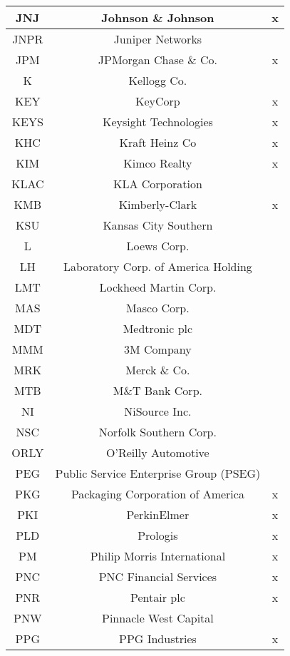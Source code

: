 \documentclass[11pt]{article}
\begin{document}
\begin{onehalfspace}
\begin{longtable}[h!]{|c|c|c|}
        JNJ & Johnson \& Johnson & x \\ \hline
        JNPR & Juniper Networks &  \\ \hline
        JPM & JPMorgan Chase \& Co. & x \\ \hline
        K & Kellogg Co. &  \\ \hline
        KEY & KeyCorp & x \\ \hline
        KEYS & Keysight Technologies & x \\ \hline
        KHC & Kraft Heinz Co & x \\ \hline
        KIM & Kimco Realty & x \\ \hline
        KLAC & KLA Corporation &  \\ \hline
        KMB & Kimberly-Clark & x \\ \hline
        KSU & Kansas City Southern &  \\ \hline
        L & Loews Corp. &  \\ \hline
        LH & Laboratory Corp. of America Holding &  \\ \hline
        LMT & Lockheed Martin Corp. &  \\ \hline
        MAS & Masco Corp. &  \\ \hline
        MDT & Medtronic plc &  \\ \hline
        MMM & 3M Company &  \\ \hline
        MRK & Merck \& Co. &  \\ \hline
        MTB & M\&T Bank Corp. &  \\ \hline
        NI & NiSource Inc. &  \\ \hline
        NSC & Norfolk Southern Corp. &  \\ \hline
        ORLY & O'Reilly Automotive &  \\ \hline
        PEG & Public Service Enterprise Group (PSEG) &  \\ \hline
        PKG & Packaging Corporation of America & x \\ \hline
        PKI & PerkinElmer & x \\ \hline
        PLD & Prologis & x \\ \hline
        PM & Philip Morris International & x \\ \hline
        PNC & PNC Financial Services & x \\ \hline
        PNR & Pentair plc & x \\ \hline
        PNW & Pinnacle West Capital &  \\ \hline
        PPG & PPG Industries & x \\ \hline

\end{longtable}
\end{onehalfspace}
\end{document}
